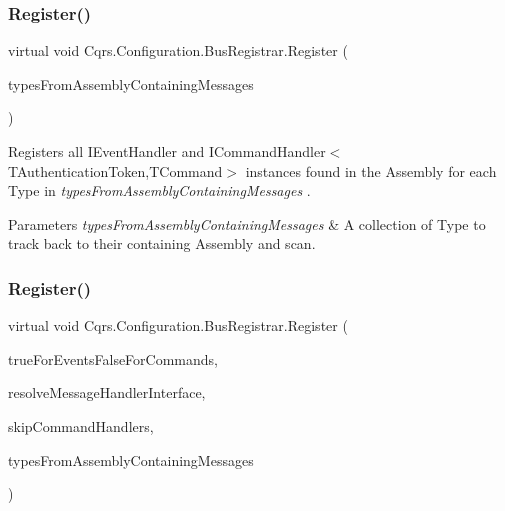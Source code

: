 \subsubsection{\texorpdfstring{Register()}{Register()}\hspace{0.1cm}{\footnotesize\ttfamily [1/2]}}
{\footnotesize\ttfamily virtual void Cqrs.\+Configuration.\+Bus\+Registrar.\+Register (\begin{DoxyParamCaption}\item[{params Type \mbox{[}$\,$\mbox{]}}]{types\+From\+Assembly\+Containing\+Messages }\end{DoxyParamCaption})\hspace{0.3cm}{\ttfamily [virtual]}}



Registers all I\+Event\+Handler and I\+Command\+Handler$<$\+T\+Authentication\+Token,\+T\+Command$>$ instances found in the Assembly for each Type in {\itshape types\+From\+Assembly\+Containing\+Messages} . 


\begin{DoxyParams}{Parameters}
{\em types\+From\+Assembly\+Containing\+Messages} & A collection of Type to track back to their containing Assembly and scan.\\
\hline
\end{DoxyParams}
\mbox{\label{classCqrs_1_1Configuration_1_1BusRegistrar_abc3af2b8dfeeb49f5e5461456ae01f67_abc3af2b8dfeeb49f5e5461456ae01f67}} 
\subsubsection{\texorpdfstring{Register()}{Register()}\hspace{0.1cm}{\footnotesize\ttfamily [2/2]}}
{\footnotesize\ttfamily virtual void Cqrs.\+Configuration.\+Bus\+Registrar.\+Register (\begin{DoxyParamCaption}\item[{bool}]{true\+For\+Events\+False\+For\+Commands,  }\item[{Func$<$ Type, I\+Enumerable$<$ Type $>$$>$}]{resolve\+Message\+Handler\+Interface,  }\item[{bool}]{skip\+Command\+Handlers,  }\item[{params Type \mbox{[}$\,$\mbox{]}}]{types\+From\+Assembly\+Containing\+Messages }\end{DoxyParamCaption})\hspace{0.3cm}{\ttfamily [virtual]}}



